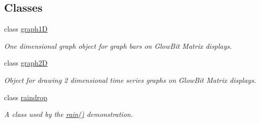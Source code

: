 \subsection*{Classes}
\begin{DoxyCompactItemize}
\item 
class \hyperlink{classglowbit_1_1glowbitMatrix_1_1graph1D}{graph1D}
\begin{DoxyCompactList}\small\item\em One dimensional graph object for graph bars on Glow\+Bit Matrix displays. \end{DoxyCompactList}\item 
class \hyperlink{classglowbit_1_1glowbitMatrix_1_1graph2D}{graph2D}
\begin{DoxyCompactList}\small\item\em Object for drawing 2 dimensional time series graphs on Glow\+Bit Matrix displays. \end{DoxyCompactList}\item 
class \hyperlink{classglowbit_1_1glowbitMatrix_1_1raindrop}{raindrop}
\begin{DoxyCompactList}\small\item\em A class used by the \hyperlink{classglowbit_1_1glowbitMatrix_a690a172f923caeb55e3adf012ec0600c}{rain()} demonstration. \end{DoxyCompactList}\end{DoxyCompactItemize}
